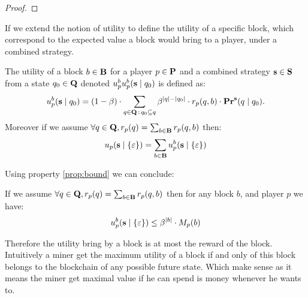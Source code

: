 \begin{proof}
\end{proof}
\fi

If we extend the notion of utility to define the utility of a specific block, which correspond to the expected value a block would bring to a player, under a combined strategy.
\begin{mydef}
The utility of a block $b \in \text{\bf B}$ for a player $p \in \mathbf{P}$ and a combined strategy $\mathbf{s} \in \mathbf{S}$ from a state $q_0 \in \mathbf{Q}$ denoted $u_p^bu_p^b(\mathbf{s} \mid q_0)$ is defined as:
\begin{equation*}
u_p^b(\mathbf{s} \mid q_0) =  (1 - \beta) \cdot  \sum_{q \in \mathbf{Q} \,:\, q_0 \subseteq q} \beta^{|q|-|q_0|} \cdot  r_p(q,b) \cdot \mathbf{Pr}^{\mathbf{s}}(q \mid q_0).
\end{equation*}
Moreover if we assume $\forall q \in \mathbf{Q}, r_p(q) = \sum_{b \in \text{\bf B}} r_p(q,b)$ then:
\begin{equation*}
u_p(\mathbf{s} \mid \{\varepsilon\}) =   \sum_{b \in \mathbf{B}} u^b_p(\mathbf{s} \mid \{\varepsilon\})
\end{equation*}
\end{mydef}


Using property \ref{prop:bound} we can conclude:
\begin{mylem}
If we assume $\forall q \in \mathbf{Q}, r_p(q) = \sum_{b \in \text{\bf B}} r_p(q,b)$ then for any block $b$, and player $p$ we have:
\begin{equation*}
u_p^b(\mathbf{s} \mid \{\varepsilon\}) \leq \beta^{|b|} \cdot M_p(b)
\end{equation*}
\end{mylem}

Therefore the utility bring by a block is at most the reward of the block. Intuitively a miner get the maximum utility of a block if and only of this block belongs to the blockchain of any possible future state. Which make sense as it means the miner get maximal value if he can spend is money whenever he wants to.





